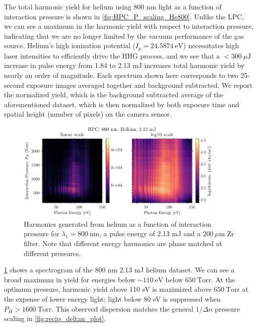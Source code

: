The total harmonic yield for helium using 800 nm light as a function of interaction pressure is shown in \cref{fig:HPC_P_scaling_He800}. Unlike the LPC, we can see a maximum in the harmonic yield with respect to interaction pressure, indicating that we are no longer limited by the vacuum performance of the gas source. Helium's high ionization potential ($I_p = 24.5874 \ \textrm{eV}$) necessitates high laser intensities to efficiently drive the HHG process, and we see that a $<300 \ \mu \textrm{J}$ increase in pulse energy from 1.84 to 2.13 mJ increases total harmonic yield by nearly an order of magnitude. Each spectrum shown here corresponds to two 25-second exposure images averaged together and background subtracted. We report the normalized yield, which is the background subtracted average of the aforementioned dataset, which is then normalized by both exposure time and spatial height (number of pixels) on the camera sensor.

\begin{figure}
	\centering
	\includegraphics[width=0.9\textwidth]{figures/chap3/HPC_800nm_He_spectrogram.pdf}
	\caption{Harmonics generated from helium as a function of interaction pressure for $\lambda_1 = 800 \ \textrm{nm}$, a pulse energy of 2.13 mJ and a $200 \ \mu \textrm{m}$ Zr filter. Note that different energy harmonics are phase matched at different pressures.}
	\label{fig:HPC_800nm_He_spectrogram}
\end{figure}

\cref{fig:HPC_800nm_He_spectrogram} shows a spectrogram of the 800 nm 2.13 mJ helium dataset. We can see a broad maximum in yield for energies below $\sim 110 \ \textrm{eV}$ below $650 \ \textrm{Torr}$. At the optimum pressure, harmonic yield above 110 eV is maximized above $650 \ \textrm{Torr}$ at the expense of lower energy light; light below 80 eV is suppressed when $P_H > 1600 \ \textrm{Torr}$. This observed dispersion matches the general $1/\Delta n$ pressure scaling in \cref{fig:recip_deltan_plot}.

